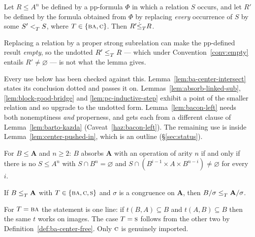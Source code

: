 \begin{lemma}\label{lem:pp-propagation}
Let $R\le A^{n}$ be defined by a pp-formula $\Phi$ in which a relation $S$
occurs, and let $R'$ be defined by the formula obtained from $\Phi$ by
replacing \emph{every} occurrence of $S$ by some $S'<_{T}^{}S$, where
$T\in\{\textup{\textsc{ba}},\textup{\textsc{c}}\}$. Then $R'\dot\le_{T}^{}R$.
\end{lemma}

\begin{hazard}\label{haz:pp-dotted}
Replacing a relation by a proper strong subrelation can make the pp-defined
result \emph{empty}, so the undotted $R'\le_{T}^{}R$ --- which under
Convention~\ref{conv:empty} entails $R'\neq\varnothing$ --- is not what the
lemma gives.

Every use below has been checked against this. Lemma~\ref{lem:ba-center-intersect}
states its conclusion dotted and passes it on. Lemmas~\ref{lem:absorb-linked-sub},
\ref{lem:block-good-bridge} and \ref{lem:pc-inductive-step} exhibit a point of
the smaller relation and so upgrade to the undotted form.
Lemma~\ref{lem:bacon-left} needs both nonemptiness \emph{and} properness, and
gets each from a different clause of Lemma~\ref{lem:barto-kazda}
(Caveat~\ref{haz:bacon-left}). The remaining use is inside
Lemma~\ref{lem:center-pushed-in}, which is an outline
(\S\ref{sec:status}).
\end{hazard}

\begin{lemma}\label{lem:barto-kazda}
For $B\le\mathbf A$ and $n\ge2$: $B$ absorbs $\mathbf A$ with an operation of
arity $n$ if and only if there is no $S\le A^{n}$ with $S\cap B^{n}=\varnothing$
and $S\cap(B^{i-1}\times A\times B^{n-i})\neq\varnothing$ for every $i$.
\end{lemma}

\begin{lemma}\label{lem:factor-type}
If $B\le_{T}^{}\mathbf A$ with $T\in\{\textup{\textsc{ba}},\textup{\textsc{c}},\textup{\textsc{s}}\}$ and $\sigma$ is a
congruence on $\mathbf A$, then $B/\sigma\le_{T}^{}\mathbf A/\sigma$.
\end{lemma}

\begin{hazard}\label{haz:factor-type}
For $T=\textup{\textsc{ba}}$ the statement is one line: if $t(B,A)\subseteq B$ and
$t(A,B)\subseteq B$ then the same $t$ works on images. The case $T=\textup{\textsc{s}}$ follows
from the other two by Definition~\ref{def:ba-center-free}. Only $\textup{\textsc{c}}$ is
genuinely imported.
\end{hazard}

